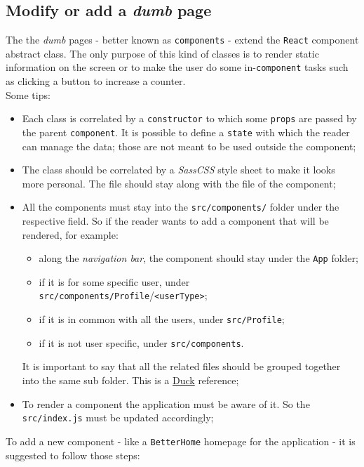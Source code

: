 \subsection{Modify or add a \emph{dumb} page}
The the \emph{dumb} pages - better known as \verb|components| - extend the \verb|React| component abstract class. The only purpose of this kind of classes is to render static information on the screen or to make the user do some in-\verb|component| tasks such as clicking a button to increase a counter.
\\Some tips: 
\begin{itemize}
	\item Each class is correlated by a \verb|constructor| to which some \verb|props| are passed by the parent \verb|component|. It is possible to define a \verb|state| with which the reader can manage the data; those are not meant to be used outside the component;
	\item The class should be correlated by a \emph{SassCSS} style sheet to make it looks more personal. The file should stay along with the file of the component;
	\item All the components must stay into the \verb|src/components/| folder under the respective field. So if the reader wants to add a component that will be rendered, for example:
	\begin{itemize}
		\item along the \emph{navigation bar}, the component should stay under the \verb|App| folder;
		\item if it is for some specific user, under \verb|src/components/Profile|/\verb|<userType>|;
		\item if it is in common with all the users, under \verb|src/Profile|;
		\item if it is not user specific, under \verb|src/components|.
	\end{itemize}  
	It is important to say that all the related files should be grouped together into the same sub folder. This is a \href{https://medium.freecodecamp.org/scaling-your-redux-app-with-ducks-6115955638be}{Duck} reference;
	\item To render a component the application must be aware of it. So the \verb|src/index.js| must be updated accordingly;
	
\end{itemize}
To add a new component - like a \verb|BetterHome| homepage for the application - it is suggested to follow those steps:
